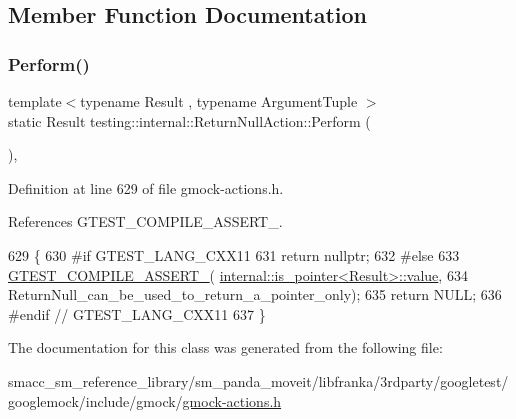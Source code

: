 \subsection{Member Function Documentation}
\mbox{\label{classtesting_1_1internal_1_1ReturnNullAction_a6ce1fba236686df93070320b399e4f32}} 
\subsubsection{\texorpdfstring{Perform()}{Perform()}}
{\footnotesize\ttfamily template$<$typename Result , typename Argument\+Tuple $>$ \\
static Result testing\+::internal\+::\+Return\+Null\+Action\+::\+Perform (\begin{DoxyParamCaption}\item[{const Argument\+Tuple \&}]{ }\end{DoxyParamCaption})\hspace{0.3cm}{\ttfamily [inline]}, {\ttfamily [static]}}



Definition at line 629 of file gmock-\/actions.\+h.



References G\+T\+E\+S\+T\+\_\+\+C\+O\+M\+P\+I\+L\+E\+\_\+\+A\+S\+S\+E\+R\+T\+\_\+.


\begin{DoxyCode}
629                                               \{
630 \textcolor{preprocessor}{#if GTEST\_LANG\_CXX11}
631     \textcolor{keywordflow}{return} \textcolor{keyword}{nullptr};
632 \textcolor{preprocessor}{#else}
633     \hyperlink{gtest-port_8h_ae1f37dc71d5daa6fb49ca1b6047d4a8c}{GTEST\_COMPILE\_ASSERT\_}(
      \hyperlink{structtesting_1_1internal_1_1bool__constant_a499fba6576296b04d99690a486424b32}{internal::is\_pointer<Result>::value},
634                           ReturnNull\_can\_be\_used\_to\_return\_a\_pointer\_only);
635     \textcolor{keywordflow}{return} NULL;
636 \textcolor{preprocessor}{#endif  // GTEST\_LANG\_CXX11}
637   \}
\end{DoxyCode}


The documentation for this class was generated from the following file\+:\begin{DoxyCompactItemize}
\item 
smacc\+\_\+sm\+\_\+reference\+\_\+library/sm\+\_\+panda\+\_\+moveit/libfranka/3rdparty/googletest/googlemock/include/gmock/\hyperlink{gmock-actions_8h}{gmock-\/actions.\+h}\end{DoxyCompactItemize}
